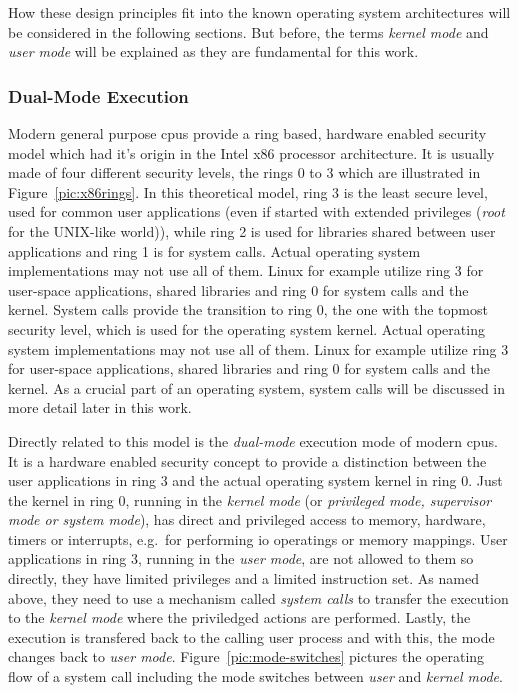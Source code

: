 How these design principles fit into the known operating system architectures will be considered in the following sections.
But before, the terms \textit{kernel mode} and \textit{user mode} will be explained as they are fundamental for this work.

\subsubsection*{Dual-Mode Execution}
Modern general purpose \acp{cpu} provide a ring based, hardware enabled security model which had it's origin in the Intel x86 processor architecture\cite{tanenbaum-modern-operating-systems}.
It is usually made of four different security levels, the rings 0 to 3 which are illustrated in Figure~\ref{pic:x86rings}.
In this theoretical model, ring 3 is the least secure level, used for common user applications (even if started with extended privileges (\textit{root} for the UNIX-like world)), while ring 2 is used for libraries shared between user applications and ring 1 is for system calls\cite{glatz2015betriebssysteme}.
Actual operating system implementations may not use all of them.
Linux for example utilize ring 3 for user-space applications, shared libraries and ring 0 for system calls and the kernel.
System calls provide the transition to ring 0, the one with the topmost security level, which is used for the operating system kernel.
Actual operating system implementations may not use all of them.
Linux for example utilize ring 3 for user-space applications, shared libraries and ring 0 for system calls and the kernel.
As a crucial part of an operating system, system calls will be discussed in more detail later in this work.

Directly related to this model is the \textit{dual-mode} execution mode of modern \acp{cpu}.
It is a hardware enabled security concept to provide a distinction between the user applications in ring 3 and the actual operating system kernel in ring 0.
Just the kernel in ring 0, running in the \textit{kernel mode} (or \textit{privileged mode, supervisor mode or system mode}), has direct and privileged access to memory, hardware, timers or interrupts, e.g.\ for performing \ac{io} operatings or memory mappings\cite{lfd430}.
User applications in ring 3, running in the \textit{user mode}, are not allowed to them so directly, they have limited privileges and a limited instruction set.
As named above, they need to use a mechanism called \textit{system calls} to transfer the execution to the \textit{kernel mode} where the priviledged actions are performed.
Lastly, the execution is transfered back to the calling user process and with this, the mode changes back to \textit{user mode}.
Figure~\ref{pic:mode-switches} pictures the operating flow of a system call including the mode switches between \textit{user} and \textit{kernel mode}.


